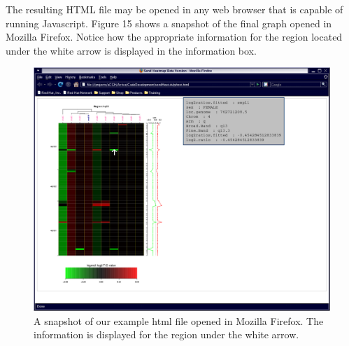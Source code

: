 \documentclass[]{article}
\begin{document}
The resulting HTML file may be opened in any web browser that is capable of running Javascript. Figure 15 shows a snapshot of the final graph opened in Mozilla Firefox. Notice how the appropriate information for the region located under the white arrow is displayed in the information box.

\begin{center}
\begin{figure}
\includegraphics{sendPlot4}
\caption{A snapshot of our example html file opened in Mozilla Firefox. The information is displayed for the region under the white arrow.}
\end{figure}
\end{center}
\end{document}
